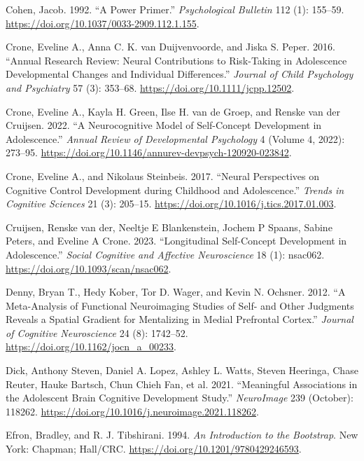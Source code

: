 \documentclass[
  letterpaper,
  DIV=11,
  numbers=noendperiod]{scrartcl}
\newlength{\cslhangindent}
\newenvironment{CSLReferences}[2] %
 {\begin{list}{}{%
  \setlength{\itemindent}{0pt}
  \setlength{\leftmargin}{0pt}
  \setlength{\parsep}{0pt}
  \ifodd #1
   \setlength{\leftmargin}{\cslhangindent}
   \setlength{\itemindent}{-1\cslhangindent}
  \fi
  \setlength{\itemsep}{#2\baselineskip}}}
 {\end{list}}
\begin{document}
\begin{CSLReferences}{1}{0}
Cohen, Jacob. 1992. {``A Power Primer.''} \emph{Psychological Bulletin}
112 (1): 155--59. \url{https://doi.org/10.1037/0033-2909.112.1.155}.

Crone, Eveline A., Anna C. K. van Duijvenvoorde, and Jiska S. Peper.
2016. {``Annual Research Review: Neural Contributions to Risk-Taking in
Adolescence {\textendash} Developmental Changes and Individual
Differences.''} \emph{Journal of Child Psychology and Psychiatry} 57
(3): 353--68. \url{https://doi.org/10.1111/jcpp.12502}.

Crone, Eveline A., Kayla H. Green, Ilse H. van de Groep, and Renske van
der Cruijsen. 2022. {``A Neurocognitive Model of Self-Concept
Development in Adolescence.''} \emph{Annual Review of Developmental
Psychology} 4 (Volume 4, 2022): 273--95.
\url{https://doi.org/10.1146/annurev-devpsych-120920-023842}.

Crone, Eveline A., and Nikolaus Steinbeis. 2017. {``Neural Perspectives
on Cognitive Control Development during Childhood and Adolescence.''}
\emph{Trends in Cognitive Sciences} 21 (3): 205--15.
\url{https://doi.org/10.1016/j.tics.2017.01.003}.

Cruijsen, Renske van der, Neeltje E Blankenstein, Jochem P Spaans,
Sabine Peters, and Eveline A Crone. 2023. {``Longitudinal Self-Concept
Development in Adolescence.''} \emph{Social Cognitive and Affective
Neuroscience} 18 (1): nsac062.
\url{https://doi.org/10.1093/scan/nsac062}.

Denny, Bryan T., Hedy Kober, Tor D. Wager, and Kevin N. Ochsner. 2012.
{``A Meta-Analysis of Functional Neuroimaging Studies of Self- and Other
Judgments Reveals a Spatial Gradient for Mentalizing in Medial
Prefrontal Cortex.''} \emph{Journal of Cognitive Neuroscience} 24 (8):
1742--52. \url{https://doi.org/10.1162/jocn_a_00233}.

Dick, Anthony Steven, Daniel A. Lopez, Ashley L. Watts, Steven Heeringa,
Chase Reuter, Hauke Bartsch, Chun Chieh Fan, et al. 2021. {``Meaningful
Associations in the Adolescent Brain Cognitive Development Study.''}
\emph{NeuroImage} 239 (October): 118262.
\url{https://doi.org/10.1016/j.neuroimage.2021.118262}.

Efron, Bradley, and R. J. Tibshirani. 1994. \emph{An Introduction to the
Bootstrap}. New York: Chapman; Hall/CRC.
\url{https://doi.org/10.1201/9780429246593}.


\end{CSLReferences}
\end{document}

